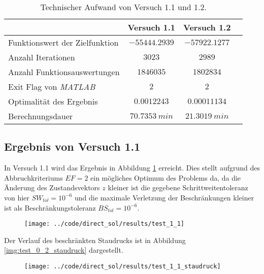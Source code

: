\begin{table}[H]
    \centering
    \caption{Technischer Aufwand von Versuch 1.1 und 1.2.}\label{tab:Versuch1_TA}
    \begin{tabularx}{.9\textwidth}{Zccc}
        \toprule
         & \textbf{Versuch 1.1} & \textbf{Versuch 1.2} \\
        \midrule
        Funktionswert der Zielfunktion & $-55444.2939$ & $-57922.1277$ \\
        Anzahl Iterationen & $3023$ & $2989$ \\
        Anzahl Funktionsauswertungen & $1846035$ & $1802834$ \\
        Exit Flag von \textit{MATLAB} & $2$ & $2$ \\
        Optimalität des Ergebnis & $0.0012243$ & $0.00011134$ \\
        Berechnungsdauer & $70.7353 \ min$ & $21.3019 \ min$ \\
        \bottomrule
    \end{tabularx}
\end{table}




\subsection{Ergebnis von Versuch 1.1}\label{kap:Versuch11}
In Versuch 1.1 wird das Ergebnis in Abbildung \ref{img:test_1_1} erreicht. Dies stellt aufgrund des Abbruchkriteriums $EF = 2$ ein mögliches Optimum des Problems da, da die Änderung des Zustandsvektors $z$ kleiner ist die gegebene Schrittweitentoleranz von hier $SW_{tol} = 10^{-6}$ und die maximale Verletzung der Beschränkungen kleiner ist als Beschränkungstoleranz $BS_{tol} = 10^{-6}$.
\begin{figure}[H]
\begin{center}
\texttt{[image: ../code/direct\_sol/results/test\_1\_1]}
 \label{img:test_1_1}
\end{center}
\end{figure}
Der Verlauf des beschränkten Staudrucks ist in Abbildung \ref{img:test_0_2_staudruck} dargestellt.
\begin{figure}[H]
\begin{center}
\texttt{[image: ../code/direct\_sol/results/test\_1\_1\_staudruck]}
 \label{img:test_1_1_staudruck}
\end{center}
\end{figure}




